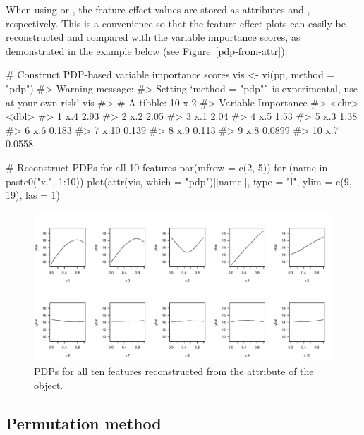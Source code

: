 When using  or , the feature effect values are stored as attributes  and , respectively. This is a convenience so that the feature effect plots can easily be reconstructed and compared with the variable importance scores, as demonstrated in the example below (see Figure~\ref{pdp-from-attr}):

\begin{example}
# Construct PDP-based variable importance scores
vis <- vi(pp, method = "pdp")
#> Warning message:
#> Setting `method = "pdp"` is experimental, use at your own risk! 
vis
#> # A tibble: 10 x 2
#>    Variable Importance
#>    <chr>         <dbl>
#>  1 x.4          2.93  
#>  2 x.2          2.05  
#>  3 x.1          2.04  
#>  4 x.5          1.53  
#>  5 x.3          1.38  
#>  6 x.6          0.183 
#>  7 x.10         0.139 
#>  8 x.9          0.113 
#>  9 x.8          0.0899
#> 10 x.7          0.0558

# Reconstruct PDPs for all 10 features
par(mfrow = c(2, 5))
for (name in paste0("x.", 1:10)) {
  plot(attr(vis, which = "pdp")[[name]], type = "l", ylim = c(9, 19), las = 1)
}
\end{example}

\begin{figure}[!htb]
  \centering 
  \includegraphics[width=1\linewidth]{figures/pdp-from-attr.pdf} 
  \caption{PDPs for all ten features reconstructed from the  attribute of the  object.}
  \label{fig:pdp-from-attr}
\end{figure}

\subsection{Permutation method}

